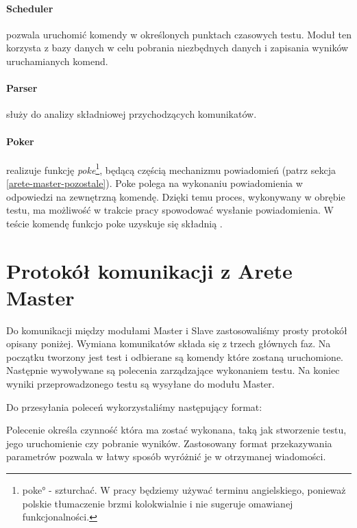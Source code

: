 \documentclass[00-praca-magisterska.tex]{subfiles}
\begin{document}
\paragraph{Scheduler} pozwala uruchomić komendy w określonych punktach czasowych
testu. Moduł ten korzysta z bazy danych w celu pobrania niezbędnych danych i
zapisania wyników uruchamianych komend.

\paragraph{Parser} służy do analizy składniowej przychodzących komunikatów.

\paragraph{Poker} realizuje funkcję \textit{poke}\footnote{\ang{poke} -
szturchać. W pracy będziemy używać terminu angielskiego, ponieważ polskie
tłumaczenie brzmi kolokwialnie i nie sugeruje omawianej funkcjonalności.},
będącą częścią mechanizmu powiadomień (patrz sekcja \ref{arete-master-pozostale}).
Poke polega na wykonaniu powiadomienia w odpowiedzi na zewnętrzną komendę.
Dzięki temu proces, wykonywany w obrębie testu, ma możliwość w trakcie pracy
spowodować wysłanie powiadomienia. W teście komendę funkcjo poke uzyskuje się
składnią .

\section{Protokół komunikacji z Arete Master}
\label{arete-slave-protokol-komunikacji-z-arete-master}

Do komunikacji między modułami Master i Slave zastosowaliśmy prosty protokół
opisany poniżej. Wymiana komunikatów składa się z trzech głównych faz. Na
początku tworzony jest test i odbierane są komendy które zostaną uruchomione.
Następnie wywoływane są polecenia zarządzające wykonaniem testu.  Na koniec
wyniki przeprowadzonego testu są wysyłane do modułu Master. 

Do przesyłania poleceń wykorzystaliśmy następujący format:


Polecenie określa czynność która ma zostać wykonana, taką jak stworzenie testu,
jego uruchomienie czy pobranie wyników. Zastosowany format przekazywania
parametrów  pozwala w łatwy sposób wyróżnić je w otrzymanej
wiadomości. 
\end{document}
